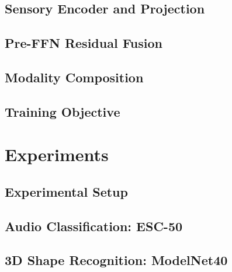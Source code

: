\documentclass[runningheads]{llncs}
\newcommand{\preffn}{Pre-FFN}
\begin{document}
\subsection{Sensory Encoder and Projection}
\label{sec:method-encoder}

\subsection{\preffn{} Residual Fusion}
\label{sec:method-preffn}

\subsection{Modality Composition}
\label{sec:method-composition}

\subsection{Training Objective}
\label{sec:method-training}

\section{Experiments}
\label{sec:experiments}

\subsection{Experimental Setup}
\label{sec:exp-setup}


\subsection{Audio Classification: ESC-50}
\label{sec:exp-esc50}


\subsection{3D Shape Recognition: ModelNet40}
\label{sec:exp-modelnet}

\end{document}
